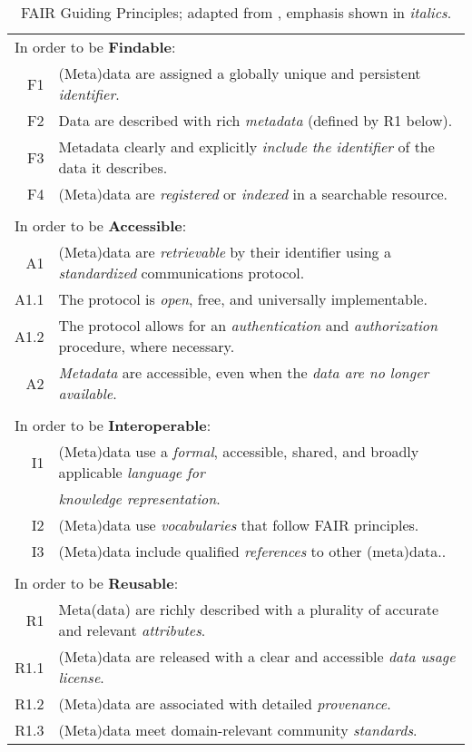 \begin{table}[htp]
\small
\begin{tabular}{|r l|}
    \hline
    \multicolumn{2}{|l|}{In order to be \textbf{Findable}:} \\
    F1 & (Meta)data are assigned a globally unique and persistent \emph{identifier}. \\
    F2 & Data are described with rich \emph{metadata} (defined by R1 below). \\
    F3 & Metadata clearly and explicitly \emph{include the identifier} of the data it describes. \\
    F4 & (Meta)data are \emph{registered} or \emph{indexed} in a searchable resource. \\
    & \\
     \multicolumn{2}{|l|}{In order to be \textbf{Accessible}:} \\


    A1 & (Meta)data are \emph{retrievable} by their identifier using a 
        \emph{standardized} communications protocol. \\
    A1.1 & The protocol is \emph{open}, free, and universally implementable. \\
    A1.2 & The protocol allows for an \emph{authentication} and  
            \emph{authorization} procedure, where necessary. \\
     A2 & \emph{Metadata} are accessible, even when the \emph{data are no longer available}. \\

     & \\
     \multicolumn{2}{|l|}{In order to be \textbf{Interoperable}:} \\
     I1 & 
     (Meta)data use a \emph{formal}, accessible, shared, and 
         broadly applicable \emph{language for} \\
        &  \emph{knowledge representation}. \\
     I2 & (Meta)data use \emph{vocabularies} that follow FAIR principles. \\
     I3 & (Meta)data include qualified \emph{references} to other (meta)data.. \\

     & \\
     \multicolumn{2}{|l|}{In order to be \textbf{Reusable}:} \\
     R1 & Meta(data) are richly described with a plurality of 
         accurate and relevant \emph{attributes}. \\
            R1.1 & (Meta)data are released with a clear and accessible \emph{data usage license}. \\
            R1.2 & (Meta)data are associated with detailed \emph{provenance}. \\
            R1.3 & (Meta)data meet domain-relevant community \emph{standards}. \\
    \hline

\end{tabular}
\caption{FAIR Guiding Principles; adapted from \cite{Wilkinson 2016}, emphasis shown in \emph{italics}.}
\label{ch10:fair}
\end{table}

